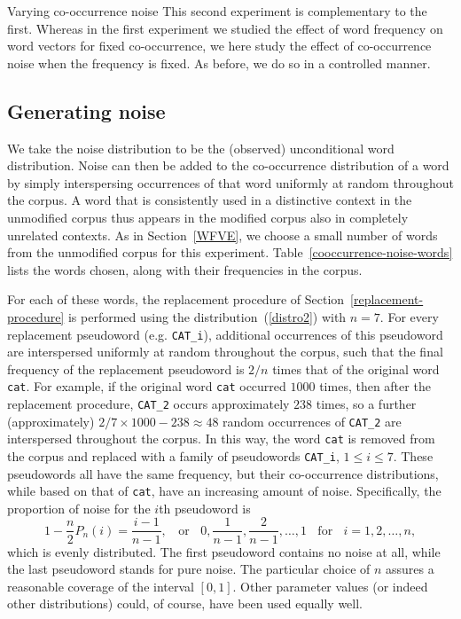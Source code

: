 \documentclass{article} %
\newcommand{\word}[1]{\texttt{#1}}
\begin{document}
\begin{section}{Varying co-occurrence noise}\label{CNVE}
This second experiment is complementary to the first.  Whereas in the
first experiment we studied the effect of word frequency on word vectors
for fixed co-occurrence, we here study the effect of co-occurrence noise
when the frequency is fixed.  As before, we do so in a controlled
manner.
  
\subsection{Generating noise}
We take the noise distribution to be the (observed) unconditional word
distribution.  Noise can then be added to the co-occurrence distribution
of a word by simply interspersing occurrences of that word uniformly at
random throughout the corpus.  A word that is consistently used in a
distinctive context in the unmodified corpus thus appears in the
modified corpus also in completely unrelated contexts.  As in
Section~\ref{WFVE}, we choose a small number of words from the
unmodified corpus for this experiment.
Table~\ref{cooccurrence-noise-words} lists the words chosen, along with
their frequencies in the corpus.

For each of these words, the replacement procedure of
Section~\ref{replacement-procedure} is performed using the
distribution~(\ref{distro2}) with $n=7$.  For every replacement pseudoword
(e.g. \word{CAT\_i}), additional occurrences of this pseudoword are
interspersed uniformly at random throughout the corpus, such that the
final frequency of the replacement pseudoword is $2/n$ times that of the
original word \word{cat}.  For example, if the original word \word{cat}
occurred $1000$ times, then after the replacement procedure,
\word{CAT\_2} occurs approximately $238$ times, so a further
(approximately) $2/7 \times 1000 - 238 \approx 48$ random occurrences of
\word{CAT\_2} are interspersed throughout the corpus.  In this way, the
word \word{cat} is removed from the corpus and replaced with a family of
pseudowords \word{CAT\_i}, $1 \leqslant i \leqslant 7$.  These pseudowords all
have the same frequency, but their co-occurrence distributions, while
based on that of \word{cat}, have an increasing amount of noise.
Specifically, the proportion of noise for the $i$th pseudoword is
%
$$ 1 - \frac{n}{2} P_n(i) = \frac{i-1}{n-1} , \;\; \textrm{ or } \;\; 0,
\frac{1}{n-1}, \frac{2}{n-1}, \ldots, 1 \;\; \textrm{ for } \;\; i =
1,2, \ldots, n , 
$$ 
%
which is evenly distributed.  The first pseudoword contains no noise at all,
while the last pseudoword stands for pure noise.  The particular choice of
$n$ assures a reasonable coverage of the interval $[0,1]$.  Other
parameter values (or indeed other distributions) could, of course, have
been used equally well.


\end{section}
\end{document}

